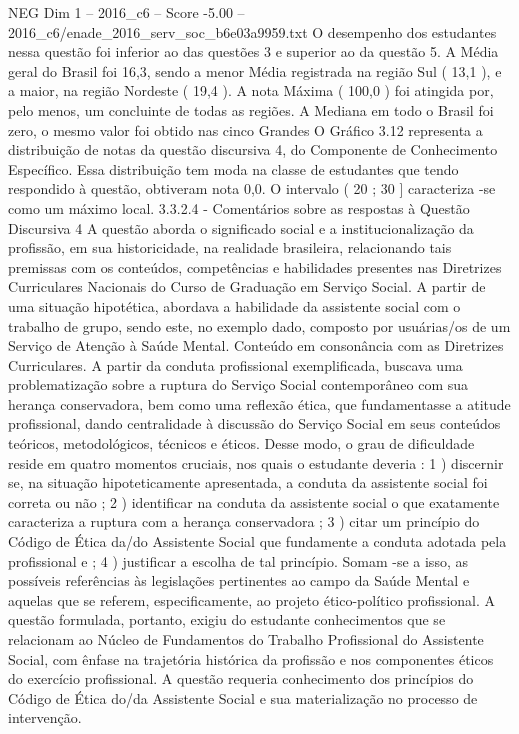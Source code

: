 \begin{textsample}{NEG Dim 1 – 2016\_c6 – Score -5.00 – 2016\_c6/enade\_2016\_serv\_soc\_b6e03a9959.txt}
O desempenho dos estudantes nessa questão foi inferior ao das questões 3 e superior ao da questão 5.
A Média geral do Brasil foi 16,3, sendo a menor Média registrada na região Sul ( 13,1 ), e a maior, na região Nordeste ( 19,4 ).
A nota Máxima ( 100,0 ) foi atingida por, pelo menos, um concluinte de todas as regiões.
A Mediana em todo o Brasil foi zero, o mesmo valor foi obtido nas cinco Grandes O Gráfico 3.12 representa a distribuição de notas da questão discursiva 4, do Componente de Conhecimento Específico.
Essa distribuição tem moda na classe de estudantes que tendo respondido à questão, obtiveram nota 0,0.
O intervalo ( 20 ; 30 ] caracteriza -se como um máximo local. 3.3.2.4 - Comentários sobre as respostas à Questão Discursiva 4 A questão aborda o significado social e a institucionalização da profissão, em sua historicidade, na realidade brasileira, relacionando tais premissas com os conteúdos, competências e habilidades presentes nas Diretrizes Curriculares Nacionais do Curso de Graduação em Serviço Social.
A partir de uma situação hipotética, abordava a habilidade da assistente social com o trabalho de grupo, sendo este, no exemplo dado, composto por usuárias/os de um Serviço de Atenção à Saúde Mental.
Conteúdo em consonância com as Diretrizes Curriculares.
A partir da conduta profissional exemplificada, buscava uma problematização sobre a ruptura do Serviço Social contemporâneo com sua herança conservadora, bem como uma reflexão ética, que fundamentasse a atitude profissional, dando centralidade à discussão do Serviço Social em seus conteúdos teóricos, metodológicos, técnicos e éticos.
Desse modo, o grau de dificuldade reside em quatro momentos cruciais, nos quais o estudante deveria : 1 ) discernir se, na situação hipoteticamente apresentada, a conduta da assistente social foi correta ou não ; 2 ) identificar na conduta da assistente social o que exatamente caracteriza a ruptura com a herança conservadora ; 3 ) citar um princípio do Código de Ética da/do Assistente Social que fundamente a conduta adotada pela profissional e ; 4 ) justificar a escolha de tal princípio.
Somam -se a isso, as possíveis referências às legislações pertinentes ao campo da Saúde Mental e aquelas que se referem, especificamente, ao projeto ético-político profissional.
A questão formulada, portanto, exigiu do estudante conhecimentos que se relacionam ao Núcleo de Fundamentos do Trabalho Profissional do Assistente Social, com ênfase na trajetória histórica da profissão e nos componentes éticos do exercício profissional.
A questão requeria conhecimento dos princípios do Código de Ética do/da Assistente Social e sua materialização no processo de intervenção.

\end{textsample}
